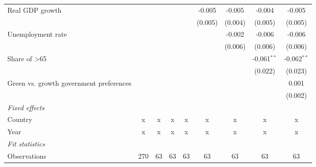 \begin{table}[htbp]
\begin{tabular}{lcccccccc}
      Real GDP growth                                                       &         &         &                &                & -0.005         & -0.005         & -0.004         & -0.005\\   
                                                                            &         &         &                &                & (0.005)        & (0.004)        & (0.005)        & (0.005)\\   
      Unemployment rate                                                     &         &         &                &                &                & -0.002         & -0.006         & -0.006\\   
                                                                            &         &         &                &                &                & (0.006)        & (0.006)        & (0.006)\\   
      Share of >65                                                          &         &         &                &                &                &                & -0.061$^{**}$  & -0.062$^{**}$\\   
                                                                            &         &         &                &                &                &                & (0.022)        & (0.023)\\   
      Green vs. growth government preferences                               &         &         &                &                &                &                &                & 0.001\\   
                                                                            &         &         &                &                &                &                &                & (0.002)\\   
      \emph{Fixed effects}\\
      Country                                                               & x       & x       & x              & x              & x              & x              & x              & x\\  
      Year                                                                  & x       & x       & x              & x              & x              & x              & x              & x\\  
      \midrule \emph{Fit statistics}\\
      Observations                                                          & 270     & 63      & 63             & 63             & 63             & 63             & 63             & 63\\  

\end{tabular}
\end{table}
